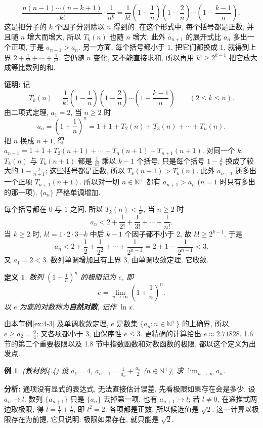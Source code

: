 \documentclass[UTF8,openany]{ctexbook}
\theoremstyle{chinesetextbook}
\newtheorem{definition}{定义}[section]
\newtheorem{example}{例}[section]
\newenvironment{cnproof}{\par\indent\textbf{证明:} \ignorespaces}{\par}
\begin{document}
\[
\frac{n(n-1)\cdots(n-k+1)}{k!}\cdot\frac1{n^k}=\frac1{k!}\left(1-\frac1n\right)\left(1-\frac2n\right)\cdots\left(1-\frac{k-1}n\right),
\]
这是把分子的 $k$ 个因子分别除以 $n$ 得到的. 在这个形式中, 每个括号都是正数, 并且随 $n$ 增大而增大, 所以 $T_k(n)$ 也随 $n$ 增大. 此外 $a_{n+1}$ 的展开式比 $a_n$ 多出一个正项, 于是 $a_{n+1}>a_n$. 另一方面, 每个括号都小于 $1$, 把它们都换成 $1$, 就得到上界 $\displaystyle2+\frac1{2!}+\cdots+\frac1{n!}$. 它仍随 $n$ 变化, 又不能直接求和, 所以再用 $k!\ge2^{k-1}$ 把它放大成等比数列的和.
\begin{cnproof}
记
\[
T_k(n)=\frac1{k!}\left(1-\frac1n\right)\left(1-\frac2n\right)\cdots\left(1-\frac{k-1}n\right)\qquad(2\le k\le n).
\]
由二项式定理, $a_1=2$, 当 $n\ge2$ 时
\[
a_n=\left(1+\frac1n\right)^n=1+1+T_2(n)+T_3(n)+\cdots+T_n(n).
\]
把 $n$ 换成 $n+1$, 得 $a_{n+1}=1+1+T_2(n+1)+\cdots+T_n(n+1)+T_{n+1}(n+1)$. 对同一个 $k$, $T_k(n)$ 与 $T_k(n+1)$ 都是 $\displaystyle\frac1{k!}$ 乘以 $k-1$ 个括号, 只是每个括号 $\displaystyle1-\frac jn$ 换成了较大的 $\displaystyle1-\frac j{n+1}$; 这些括号都是正数, 所以 $T_k(n+1)>T_k(n)$. 此外 $a_{n+1}$ 还多出一个正项 $T_{n+1}(n+1)$. 所以对一切 $n\in\mathbb N^+$ 都有 $a_{n+1}>a_n$ ($n=1$ 时只有多出的那一项), $\{a_n\}$ 严格单调增加.

每个括号都在 $0$ 与 $1$ 之间, 所以 $\displaystyle T_k(n)<\frac1{k!}$, 当 $n\ge2$ 时
\[
a_n<2+\frac1{2!}+\frac1{3!}+\cdots+\frac1{n!}.
\]
当 $k\ge2$ 时, $k!=1\cdot2\cdot3\cdots k$ 中后 $k-1$ 个因子都不小于 $2$, 故 $k!\ge2^{k-1}$. 于是
\[
a_n<2+\frac12+\frac1{2^2}+\cdots+\frac1{2^{n-1}}=2+1-\frac1{2^{n-1}}<3.
\]
又 $a_1=2<3$. 数列单调增加且有上界 $3$, 由单调收敛定理, 它收敛.
\end{cnproof}
\begin{definition}
数列 $\displaystyle\left(1+\frac1n\right)^n$ 的极限记为 $e$, 即
\[
e=\lim_{n\to\infty}\left(1+\frac1n\right)^n.
\]
以 $e$ 为底的对数称为\textbf{自然对数}, 记作 $\ln x$.
\end{definition}
由本节例\ref{ex:4-3} 及单调收敛定理, $e$ 是数集 $\{a_n:n\in\mathbb N^+\}$ 的上确界, 所以 $\displaystyle e\ge a_2=\frac94$; 又各项都小于 $3$, 由保序性 $e\le3$. 更精确的计算给出 $e\approx2.71828$. 1.6 节的第二个重要极限以及 1.8 节中指数函数和对数函数的极限, 都以这个定义为出发点.
\begin{example}\label{ex:4-4}
\textnormal{(教材例4.4)} 设 $a_1=4$, $\displaystyle a_{n+1}=\frac1{a_n}+\frac{a_n}2$ ($n\in\mathbb N^+$), 求 $\displaystyle\lim_{n\to\infty}a_n$.
\end{example}
\par\indent\textbf{分析:} 通项没有显式的表达式, 无法直接估计误差. 先看极限如果存在会是多少. 设 $a_n\to l$. 数列 $\{a_{n+1}\}$ 只是 $\{a_n\}$ 去掉第一项, 也有 $a_{n+1}\to l$; 若 $l\ne0$, 在递推式两边取极限, 得 $\displaystyle l=\frac1l+\frac l2$, 即 $l^2=2$. 各项都是正数, 所以候选值是 $\sqrt2$. 这一计算以极限存在为前提, 它只说明: 极限如果存在, 就只能是 $\sqrt2$.
\end{document}
